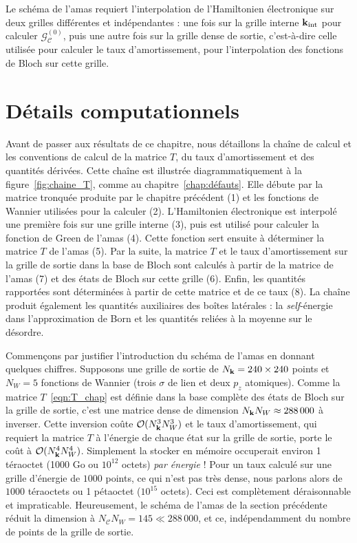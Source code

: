 Le schéma de l'amas requiert l'interpolation de l'Hamiltonien électronique sur deux grilles différentes et indépendantes : une fois sur la grille interne $\mathbf{k}_\text{int}$ pour calculer $\bm{\mathcal{G}}^{(0)}_\mathcal{C}$, puis une autre fois sur la grille dense de sortie, c'est-à-dire celle utilisée pour calculer le taux d'amortissement, pour l'interpolation des fonctions de Bloch sur cette grille.

\section{Détails computationnels}\label{sec:T_détails}

Avant de passer aux résultats de ce chapitre, nous détaillons la chaîne de calcul et les conventions de calcul de la matrice $T$, du taux d'amortissement et des quantités dérivées. Cette chaîne est illustrée diagrammatiquement à la figure~\ref{fig:chaine_T}, comme au chapitre~\ref{chap:défauts}. Elle débute par la matrice tronquée produite par le chapitre précédent (1) et les fonctions de Wannier utilisées pour la calculer (2). L'Hamiltonien électronique est interpolé une première fois sur une grille interne (3), puis est utilisé pour calculer la fonction de Green de l'amas (4). Cette fonction sert ensuite à déterminer la matrice $T$ de l'amas (5). Par la suite, la matrice $T$ et le taux d'amortissement sur la grille de sortie dans la base de Bloch sont calculés à partir de la matrice de l'amas (7) et des états de Bloch sur cette grille (6). Enfin, les quantités rapportées sont déterminées à partir de cette matrice et de ce taux (8). La chaîne produit également les quantités auxiliaires des boîtes latérales : la \textit{self}-énergie dans l'approximation de Born et les quantités reliées à la moyenne sur le désordre.

\bigskip
{}

Commençons par justifier l'introduction du schéma de l'amas en donnant quelques chiffres. Supposons une grille de sortie de $N_{\mathbf{k}} = 240\times 240$ points et $N_W=5$ fonctions de Wannier (trois $\sigma$ de lien et deux $p_z$ atomiques). Comme la matrice $T$~\eqref{eqn:T_chap} est définie dans la base complète des états de Bloch sur la grille de sortie, c'est une matrice dense de dimension $N_{\mathbf{k}} N_W\approx288\,000$ à inverser. Cette inversion coûte $\mathcal{O}(N_{\mathbf{k}}^3N_W^3)$ et le taux d'amortissement, qui requiert la matrice $T$ à l'énergie de chaque état sur la grille de sortie, porte le coût à $\mathcal{O}(N_{\mathbf{k}}^4N_W^4)$. Simplement la stocker en mémoire occuperait environ 1 téraoctet (1000 Go ou $10^{12}$ octets) \textit{par énergie} ! Pour un taux calculé sur une grille d'énergie de $1000$ points, ce qui n'est pas très dense, nous parlons alors de $1000$ téraoctets ou 1 pétaoctet ($10^{15}$ octets). Ceci est complètement déraisonnable et impraticable. Heureusement, le schéma de l'amas de la section précédente réduit la dimension à $N_\mathcal{C}N_W=145 \ll 288\,000$, et ce, indépendamment du nombre de points de la grille de sortie.

